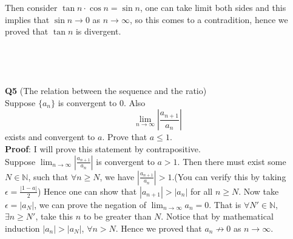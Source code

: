 \documentclass{article}
\begin{document}
Then consider $\tan n \cdot \cos n = \sin n$, one can take limit both sides and this implies that $\sin n \rightarrow 0$ as $n\rightarrow \infty$, so this comes to a
contradition, hence we proved that $\tan n$ is divergent.\\
\\
\\
\\
\\
\textbf{Q5} (The relation between the sequence and the ratio)\\
Suppose $\{a_n\}$ is convergent to $0$. Also
$$
\lim_{n \to \infty} \left | \frac{a_{n+1}}{a_n} \right |
$$
exists and convergent to $a$. Prove that $a\leq 1$.\\
\textbf{Proof}: I will prove this statement by contrapositive. \\
Suppose $\lim_{n \to \infty} \left | \frac{a_{n+1}}{a_n}\right |$ is convergent to $a>1$. Then there must exist some $N \in \mathbb{N}$, 
such that $\forall n \geq N$, we have $\left | \frac{a_{n+1}}{a_n}\right |  > 1$.(You can verify this by taking $\epsilon = \frac{| 1- a |}{2}$) 
Hence one can show that $\left | a_{n+1}\right | > \left |a_n\right |$ for all $n \geq N$. Now take $\epsilon = \left | a_N \right |$, we can prove the negation of $\lim_{n \to \infty} a_n = 0$. 
That is $\forall N' \in \mathbb{N}$, $\exists n \geq N'$, take this $n$ to be greater than $N$.
Notice that by mathematical induction $\left | a_{n} \right | > \left | a_N \right |$, $\forall n > N$. Hence we proved that $a_n \not \rightarrow 0$ as $n \rightarrow \infty$.\\
\\
\\
\\
\\
\newpage
\end{document}
